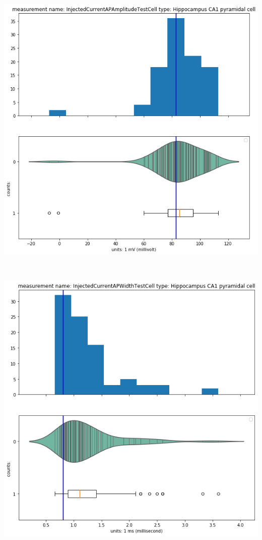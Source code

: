     \begin{center}
    \includegraphics[width=0.7\linewidth]{notebooks_converted/needata_thesis_files/needata_thesis_5_31}
    \end{center}
    { \hspace*{\fill} \\}
    
    \begin{center}
    \includegraphics[width=0.7\linewidth]{notebooks_converted/needata_thesis_files/needata_thesis_5_32}
    \end{center}
    { \hspace*{\fill} \\}
    
